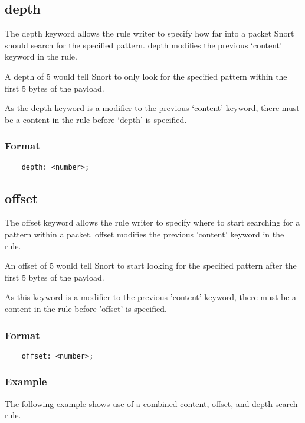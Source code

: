 \documentclass[english]{report}
\begin{document}
\subsection{depth}
\label{sub:depth}

The depth keyword allows the rule writer to specify how far into a packet Snort
should search for the specified pattern.  depth modifies the previous `content'
keyword in the rule.

A depth of 5 would tell Snort to only look for the specified pattern within the
first 5 bytes of the payload.

As the depth keyword is a modifier to the previous `content' keyword, there
must be a content in the rule before `depth' is specified.

\subsubsection{Format}

\begin{verbatim}
    depth: <number>;
\end{verbatim}

\subsection{offset}
\label{sub:offset}

The offset keyword allows the rule writer to specify where to start searching
for a pattern within a packet.  offset modifies the previous 'content' keyword
in the rule.

An offset of 5 would tell Snort to start looking for the specified pattern
after the first 5 bytes of the payload.

As this keyword is a modifier to the previous 'content' keyword, there must be
a content in the rule before 'offset' is specified.

\subsubsection{Format}

\begin{verbatim}
    offset: <number>;
\end{verbatim}

\subsubsection{Example}

The following example shows use of a combined content, offset, and depth search
rule.
\end{document}
